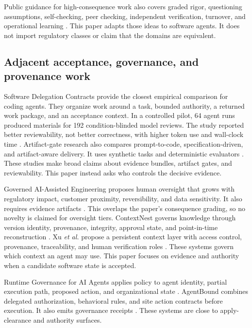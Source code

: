 \documentclass[11pt]{article}
\newcommand{\etal}{\textit{et al.}}
\begin{document}
Public guidance for high-consequence work also covers graded rigor, questioning assumptions, self-checking, peer checking, independent verification, turnover, and operational learning \citep{doe2009hpi}. This paper adapts those ideas to software agents. It does not import regulatory classes or claim that the domains are equivalent.

\subsection{Adjacent acceptance, governance, and provenance work}

Software Delegation Contracts provide the closest empirical comparison for coding agents. They organize work around a task, bounded authority, a returned work package, and an acceptance context. In a controlled pilot, 64 agent runs produced materials for 192 condition-blinded model reviews. The study reported better reviewability, not better correctness, with higher token use and wall-clock time \citep{schmalbach2026contracts}. Artifact-gate research also compares prompt-to-code, specification-driven, and artifact-aware delivery. It uses synthetic tasks and deterministic evaluators \citep{ravuru2026artifact}. These studies make broad claims about evidence bundles, artifact gates, and reviewability. This paper instead asks who controls the decisive evidence.

Governed AI-Assisted Engineering proposes human oversight that grows with regulatory impact, customer proximity, reversibility, and data sensitivity. It also requires evidence artifacts \citep{kang2026gaie}. This overlaps the paper's consequence grading, so no novelty is claimed for oversight tiers. ContextNest governs knowledge through version identity, provenance, integrity, approval state, and point-in-time reconstruction \citep{sulpovar2026contextnest}. Xu \etal{} propose a persistent context layer with access control, provenance, traceability, and human verification roles \citep{xu2025everything}. These systems govern which context an agent may use. This paper focuses on evidence and authority when a candidate software state is accepted.

Runtime Governance for AI Agents applies policy to agent identity, partial execution path, proposed action, and organizational state \citep{kaptein2026runtime}. AgentBound combines delegated authorization, behavioral rules, and site action contracts before execution. It also emits governance receipts \citep{kaul2026agentbound}. These systems are close to apply-clearance and authority surfaces.
\end{document}
